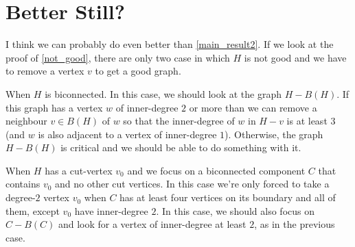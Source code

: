 \documentclass[12pt]{article}
\begin{document}
\section{Better Still?}

I think we can probably do even better than \cref{main_result2}. If we look at the proof of \cref{not_good}, there are only two case in which $H$ is not good and we have to remove a vertex $v$ to get a good graph.
\begin{compactenum}
  \item When $H$ is biconnected.  In this case, we should look at the graph $H-B(H)$.  If this graph has a vertex $w$ of inner-degree $2$ or more than we can remove a neighbour $v\in B(H)$ of $w$ so that the inner-degree of $w$ in $H-v$ is at least $3$ (and $w$ is also adjacent to a vertex of inner-degree $1$). Otherwise, the graph $H-B(H)$ is critical and we should be able to do something with it.

  \item When $H$ has a cut-vertex $v_0$ and we focus on a biconnected component $C$ that contains $v_0$ and no other cut vertices.  In this case we're only forced to take a degree-$2$ vertex $v_0$ when $C$ has at least four vertices on its boundary and all of them, except $v_0$ have inner-degree $2$.  In this case, we should also focus on $C-B(C)$ and look for a vertex of inner-degree at least $2$, as in the previous case.
\end{compactenum}


\end{document}
